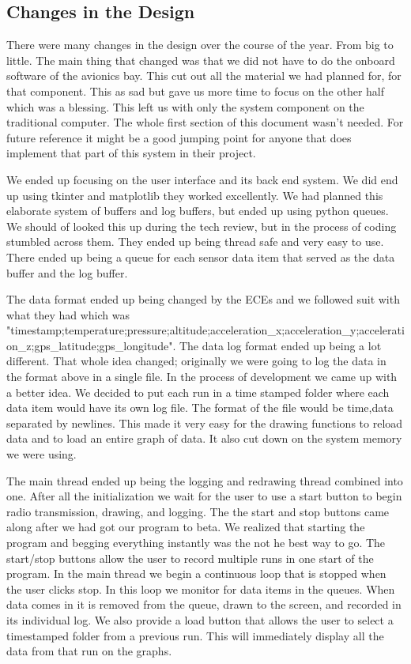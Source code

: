 \documentclass[10pt,draftclsnofoot,onecolumn,retainorgcmds]{IEEEtran}
\begin{document}
\subsection{Changes in the Design}
There were many changes in the design over the course of the year. From big to little. The main thing that changed was that we did not have to do the onboard software of the avionics bay. This cut out all the material we had planned for, for that component. This as sad but gave us more time to focus on the other half which was a blessing. This left us with only the system component on the traditional computer. The whole first section of this document wasn't needed. For future reference it might be a good jumping point for anyone that does implement that part of this system in their project. \par
We ended up focusing on the user interface and its back end system. We did end up using tkinter and matplotlib they worked excellently. We had planned this elaborate system of buffers and log buffers, but ended up using python queues. We should of looked this up during the tech review, but in the process of coding stumbled across them. They ended up being thread safe and very easy to use. There ended up being a queue for each sensor data item that served as the data buffer and the log buffer. \par 
The data format ended up being changed by the ECEs and we followed suit with what they had which was "timestamp;temperature;pressure;altitude;acceleration\_x;acceleration\_y;acceleration\_z;gps\_latitude;gps\_longitude". The data log format ended up being a lot different. That whole idea changed; originally we were going to log the data in the format above in a single file. In the process of development we came up with a better idea. We decided to put each run in a time stamped folder where each data item would have its own log file. The format of the file would be time,data separated by newlines. This made it very easy for the drawing functions to reload data and to load an entire graph of data. It also cut down on the system memory we were using. \par
The main thread ended up being the logging and redrawing thread combined into one. After all the initialization we wait for the user to use a start button to begin radio transmission, drawing, and logging. The the start and stop buttons came along after we had got our program to beta. We realized that starting the program and begging everything instantly was the not he best way to go. The start/stop buttons allow the user to record multiple runs in one start of the program. In the main thread we begin a continuous loop that is stopped when the user clicks stop. In this loop we monitor for data items in the queues. When data comes in it is removed from the queue, drawn to the screen, and recorded in its individual log. We also provide a load button that allows the user to select a timestamped folder from a previous run. This will immediately display all the data from that run on the graphs.\par
\end{document}
